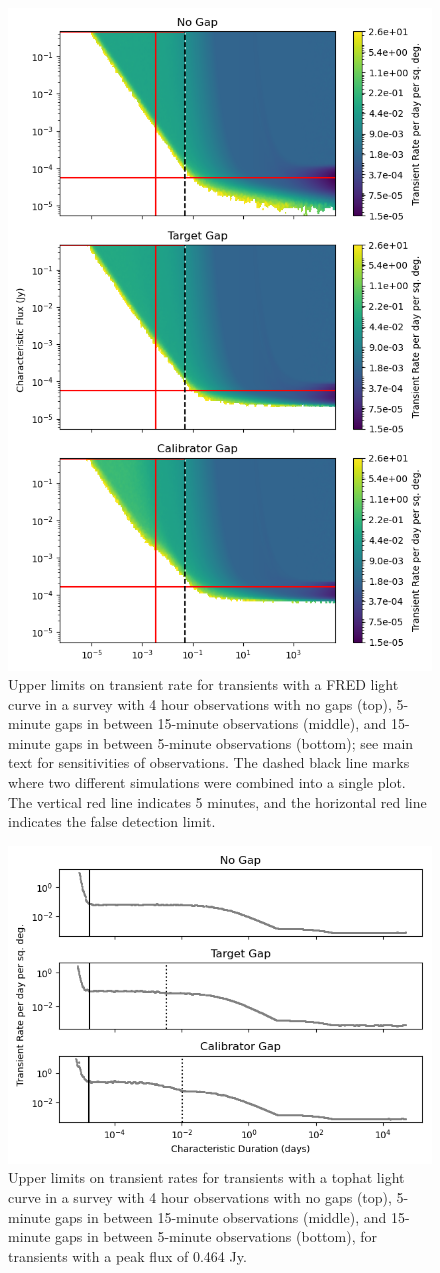 \documentclass[12pt]{article}
\begin{document}
 \begin{figure}
\includegraphics[width=0.75\columnwidth]{figure4.png}
\caption{Upper limits on transient rate for transients with a FRED light curve in a survey with 4 hour observations with no gaps (top), 5-minute gaps in between 15-minute observations (middle), and 15-minute gaps in between 5-minute observations (bottom); see main text for sensitivities of observations. The dashed black line marks where two different simulations were combined into a single plot. The vertical red line indicates 5 minutes, and the horizontal red line indicates the false detection limit.}
\label{fig4}
 \end{figure}
 
 \begin{figure}
\includegraphics[width=0.75\columnwidth]{figure5.png}
\caption{Upper limits on transient rates for transients with a tophat light curve in a survey with 4 hour observations with no gaps (top), 5-minute gaps in between 15-minute observations (middle), and 15-minute gaps in between 5-minute observations (bottom), for transients with a peak flux of 0.464 Jy.}
\label{fig5}
 \end{figure}
 
\end{document}
